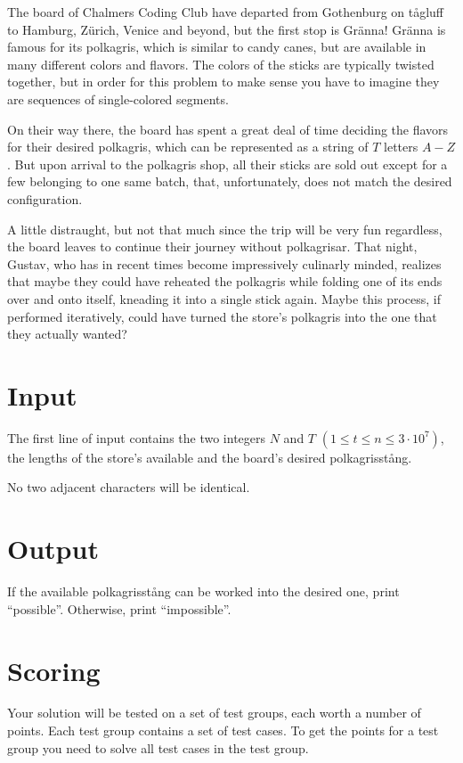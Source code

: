 \noindent

The board of Chalmers Coding Club have departed from Gothenburg on tågluff to Hamburg, Zürich, Venice and
beyond, but the first stop is Gränna! Gränna is famous for its polkagris, which is similar to candy
canes, but are available in many different colors and flavors. The colors of the sticks are typically
twisted together, but in order for this problem to make sense you have to imagine they are sequences
of single-colored segments.

On their way there, the board has spent a great deal of time deciding the flavors for their desired
polkagris, which can be represented as a string of $T$ letters $A-Z$. But upon arrival to the
polkagris shop, all their sticks are sold out except for a few belonging to one same batch, that,
unfortunately, does not match the desired configuration.

A little distraught, but not that much since the trip will be very fun regardless, the board leaves
to continue their journey without polkagrisar. That night, Gustav, who has in recent times become
impressively culinarly minded, realizes that maybe they could have reheated the polkagris while
folding one of its ends over and onto itself, kneading it into a single stick again. Maybe this
process, if performed iteratively, could have turned the store's polkagris into the one that they
actually wanted?

\section*{Input}

The first line of input contains the two integers $N$ and $T$ $(1 \leq t \leq n \leq 3 \cdot 10^7)$,
the lengths of the store's available and the board's desired polkagrisstång. 

No two adjacent characters will be identical.

\section*{Output}
If the available polkagrisstång can be worked into the desired one, print ``possible''. Otherwise, print ``impossible''.

\section*{Scoring}
Your solution will be tested on a set of test groups, each worth a number of points. Each test group contains
a set of test cases. To get the points for a test group you need to solve all test cases in the test group.


